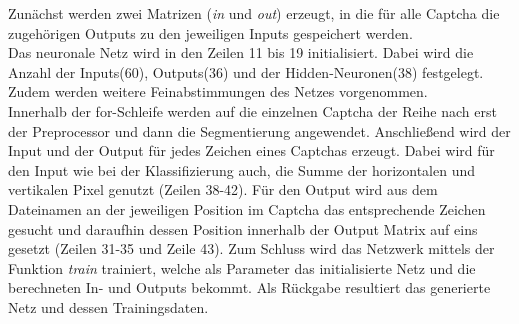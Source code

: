 Zunächst werden zwei Matrizen (\textit{in} und \textit{out}) erzeugt, in die für alle Captcha die zugehörigen Outputs zu den jeweiligen Inputs gespeichert werden.\\
Das neuronale Netz wird in den Zeilen 11 bis 19 initialisiert. Dabei wird die Anzahl der Inputs(60), Outputs(36) und der Hidden-Neuronen(38) festgelegt. Zudem werden weitere Feinabstimmungen des Netzes vorgenommen.\\
Innerhalb der for-Schleife werden auf die einzelnen Captcha der Reihe nach erst der Preprocessor und dann die Segmentierung angewendet. Anschließend wird der Input und der Output für jedes Zeichen eines Captchas erzeugt. Dabei wird für den Input wie bei der Klassifizierung auch, die Summe der horizontalen und vertikalen Pixel genutzt (Zeilen 38-42). Für den Output wird aus dem Dateinamen an der jeweiligen Position im Captcha das entsprechende Zeichen gesucht und daraufhin dessen Position innerhalb der Output Matrix auf eins gesetzt (Zeilen 31-35 und Zeile 43). Zum Schluss wird das Netzwerk mittels der Funktion \textit{train} trainiert, welche als Parameter das initialisierte Netz und die berechneten In- und Outputs bekommt. Als Rückgabe resultiert das generierte Netz und dessen Trainingsdaten.

\newpage
